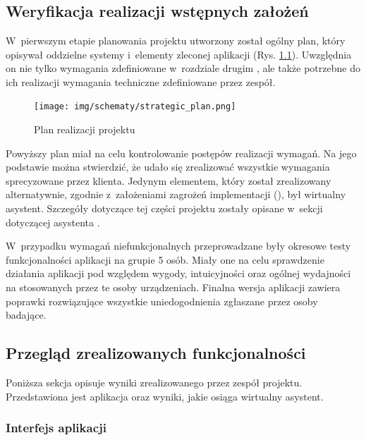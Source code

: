 \chapter{\ChapterTitleResults}
\label{sec:wyniki-projektu}

\section{Weryfikacja realizacji wstępnych założeń}

W~pierwszym etapie planowania projektu utworzony został ogólny
plan, który opisywał oddzielne systemy i~elementy
zleconej aplikacji (Rys. \ref{fig:figma_strategicplan}).
Uwzględnia on nie tylko wymagania zdefiniowane w~rozdziale drugim
, ale także potrzebne do ich
realizacji wymagania techniczne zdefiniowane przez zespół.

\begin{figure}[h!]
  \centering
  \texttt{[image: img/schematy/strategic\_plan.png]}
  \caption{Plan realizacji projektu}
  \label{fig:figma_strategicplan}
\end{figure}

Powyższy plan miał na celu kontrolowanie postępów realizacji wymagań.
Na jego podstawie można stwierdzić, że udało się
zrealizować wszystkie wymagania sprecyzowane przez klienta.
Jedynym elementem, który został zrealizowany alternatywnie,
zgodnie z~założeniami zagrożeń implementacji
(), był wirtualny asystent. Szczegóły
dotyczące tej części projektu zostały opisane w~sekcji dotyczącej
asystenta .

W~przypadku wymagań niefunkcjonalnych przeprowadzane były okresowe testy
funkcjonalności aplikacji na grupie 5 osób. Miały one na celu sprawdzenie
działania aplikacji pod względem wygody, intuicyjności oraz ogólnej
wydajności na stosowanych przez te osoby urządzeniach. Finalna wersja
aplikacji zawiera poprawki rozwiązujące wszystkie uniedogodnienia zgłaszane
przez osoby badające.

\section{Przegląd zrealizowanych funkcjonalności}

Poniższa sekcja opisuje wyniki zrealizowanego przez zespół
projektu. Przedstawiona jest aplikacja oraz wyniki, jakie
osiąga wirtualny asystent.

\subsection{Interfejs aplikacji}

